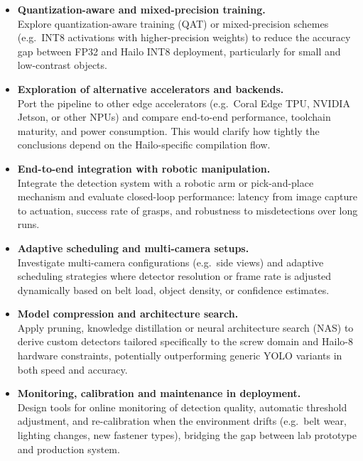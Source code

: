 \documentclass[12pt,a4paper]{report}
\begin{document}
\begin{itemize}[leftmargin=1.5em]
    \item \textbf{Quantization-aware and mixed-precision training.}\\
          Explore quantization-aware training (QAT) or mixed-precision schemes (e.g.\ INT8
          activations with higher-precision weights) to reduce the accuracy gap between FP32
          and Hailo INT8 deployment, particularly for small and low-contrast objects.

    \item \textbf{Exploration of alternative accelerators and backends.}\\
          Port the pipeline to other edge accelerators (e.g.\ Coral Edge TPU, NVIDIA Jetson,
          or other NPUs) and compare end-to-end performance, toolchain maturity, and power
            consumption.
          This would clarify how tightly the conclusions depend on the Hailo-specific compilation flow.

    \item \textbf{End-to-end integration with robotic manipulation.}\\
          Integrate the detection system with a robotic arm or pick-and-place mechanism and evaluate
          closed-loop performance: latency from image capture to actuation, success rate of grasps,
          and robustness to misdetections over long runs.

    \item \textbf{Adaptive scheduling and multi-camera setups.}\\
          Investigate multi-camera configurations (e.g.\ side views) and adaptive scheduling
          strategies where detector resolution or frame rate is adjusted dynamically based on belt
          load, object density, or confidence estimates.

    \item \textbf{Model compression and architecture search.}\\
          Apply pruning, knowledge distillation or neural architecture search (NAS) to derive custom
          detectors tailored specifically to the screw domain and Hailo-8 hardware constraints,
          potentially outperforming generic YOLO variants in both speed and accuracy.

    \item \textbf{Monitoring, calibration and maintenance in deployment.}\\
          Design tools for online monitoring of detection quality, automatic threshold adjustment,
          and re-calibration when the environment drifts (e.g.\ belt wear, lighting changes,
          new fastener types), bridging the gap between lab prototype and production system.
\end{itemize}
\end{document}
